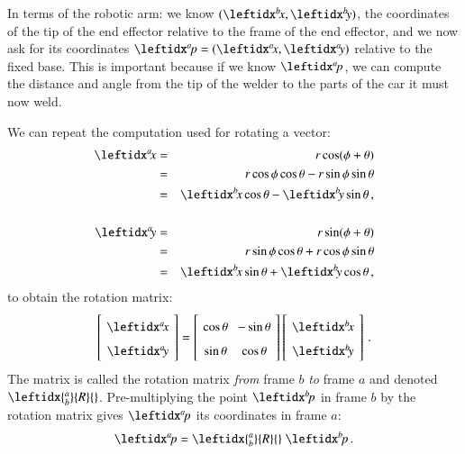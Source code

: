 In terms of the robotic arm: we know $(\bx,\by)$, the coordinates of the tip of the end effector relative to the frame of the end effector, and we now ask for its coordinates $\ap=(\ax,\ay)$ relative to the fixed base. This is important because if we know $\ap$, we can compute the distance and angle from the tip of the welder to the parts of the car it must now weld.

We can repeat the computation used for rotating a vector:
\begin{eqnarray*}
\ax &=& r\cos(\phi+\theta)\\
&=&r\cos\phi\cos\theta - r\sin\phi\sin\theta\\
&=&\bx\cos\theta - \by\sin\theta\,,\\
\\
\ay &=& r\sin(\phi+\theta)\\
&=&r\sin\phi\cos\theta + r\cos\phi\sin\theta\\
&=&\bx\sin\theta + \by\cos\theta\,,\\
\end{eqnarray*}
to obtain the rotation matrix:
\begin{equation}
\spacearray
\left[\begin{array}{c}\ax\\\ay\end{array}\right]=
\left[\begin{array}{cc}\cos\theta&-\sin\theta\\\sin\theta&\cos\theta\end{array}\right]
\left[\begin{array}{c}\bx\\\by\end{array}\right]\,.\label{eq.frame-to-frame}
\end{equation}
The matrix is called the rotation matrix \emph{from} frame $b$ \emph{to} frame $a$ and denoted $\leftidx{^a_b}{R}{}$. Pre-multiplying the point $\bp$ in frame $b$ by the rotation matrix gives $\ap$ its coordinates in frame $a$:
\[
\ap = \leftidx{^a_b}{R}{} \; \bp\,.
\]

\medskip

